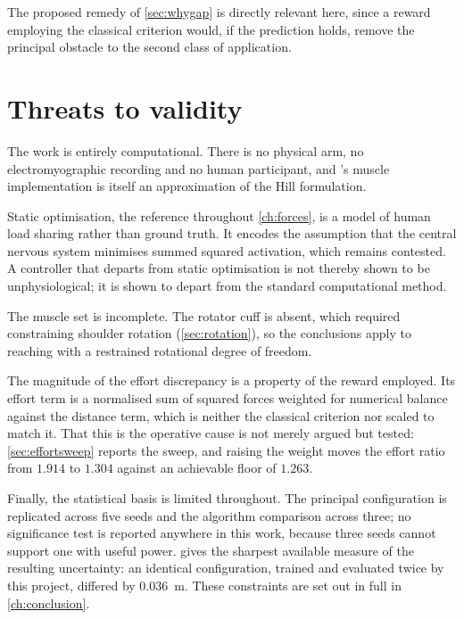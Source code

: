 The proposed remedy of \cref{sec:whygap} is directly relevant here, since a
reward employing the classical criterion would, if the prediction holds, remove
the principal obstacle to the second class of application.

\section{Threats to validity}

The work is entirely computational. There is no physical arm, no
electromyographic recording and no human participant, and \MuJoCo's muscle
implementation is itself an approximation of the Hill formulation.

Static optimisation, the reference throughout \cref{ch:forces}, is a model of
human load sharing rather than ground truth. It encodes the assumption that the
central nervous system minimises summed squared activation, which remains
contested. A controller that departs from static optimisation is not thereby
shown to be unphysiological; it is shown to depart from the standard
computational method.

The muscle set is incomplete. The rotator cuff is absent, which required
constraining shoulder rotation (\cref{sec:rotation}), so the conclusions apply to
reaching with a restrained rotational degree of freedom.

The magnitude of the effort discrepancy is a property of the reward employed. Its
effort term is a normalised sum of squared forces weighted for numerical balance
against the distance term, which is neither the classical criterion nor scaled to
match it. That this is the operative cause is not merely argued but tested:
\cref{sec:effortsweep} reports the sweep, and raising the weight moves the effort
ratio from $1.914$ to $1.304$ against an achievable floor of $1.263$.

Finally, the statistical basis is limited throughout. The principal configuration
is replicated across five seeds and the algorithm comparison across three; no
significance test is reported anywhere in this work, because three seeds cannot
support one with useful power.  gives the sharpest available
measure of the resulting uncertainty: an identical configuration, trained and
evaluated twice by this project, differed by \SI{0.036}{\meter}. These
constraints are set out in full in \cref{ch:conclusion}.

